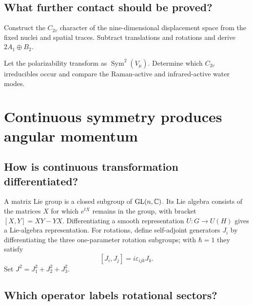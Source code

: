 \section{What further contact should be proved?}

\begin{exercise}
Construct the $C_{2v}$ character of the nine-dimensional displacement space
from the fixed nuclei and spatial traces.  Subtract translations and rotations
and derive $2A_1\oplus B_2$.
\end{exercise}

\begin{exercise}
Let the polarizability transform as $\operatorname{Sym}^2(V_\mu)$.  Determine
which $C_{2v}$ irreducibles occur and compare the Raman-active and
infrared-active water modes.
\end{exercise}


\chapter{Continuous symmetry produces angular momentum}
\label{ch:lie}



\section{How is continuous transformation differentiated?}

A matrix Lie group is a closed subgroup of $\operatorname{GL}(n,\mathbb C)$.  Its
Lie algebra consists of the matrices $X$ for which $e^{tX}$ remains in the
group, with bracket $[X,Y]=XY-YX$.  Differentiating a smooth representation
$U:G\to U(H)$ gives a Lie-algebra representation.  For rotations, define
self-adjoint generators $J_i$ by differentiating the three one-parameter
rotation subgroups; with $\hbar=1$ they satisfy
\[
[J_i,J_j]=i\varepsilon_{ijk}J_k.
\]
Set $J^2=J_1^2+J_2^2+J_3^2$.

\section{Which operator labels rotational sectors?}

